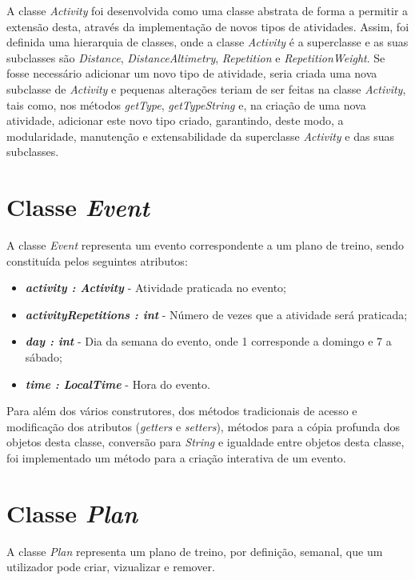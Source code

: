 \documentclass[a4paper,12pt]{scrreprt}
\begin{document}
    A classe \textit{Activity} foi desenvolvida como uma classe abstrata de forma a permitir a extensão desta, através da implementação de novos tipos de atividades. Assim, foi definida uma hierarquia de classes, onde a classe \textit{Activity} é a superclasse e as suas subclasses são \textit{Distance}, \textit{DistanceAltimetry}, \textit{Repetition} e \textit{RepetitionWeight}.
    Se fosse necessário adicionar um novo tipo de atividade, seria criada uma nova subclasse de \textit{Activity} e pequenas alterações teriam de ser feitas na classe \textit{Activity}, tais como, nos métodos \textit{getType}, \textit{getTypeString} e, na criação de uma nova atividade, adicionar este novo tipo criado, garantindo, deste modo, a modularidade, manutenção e extensabilidade da superclasse \textit{Activity} e das suas subclasses.

\section{Classe \textit{Event}}
    A classe \textit{Event} representa um evento correspondente a um plano de treino, sendo constituída pelos seguintes atributos:

    \begin{itemize}
        \item \textit{\textbf{activity : Activity}} - Atividade praticada no evento;
        \item \textit{\textbf{activityRepetitions : int}} - Número de vezes que a atividade será praticada;
        \item \textit{\textbf{day : int}} - Dia da semana do evento, onde 1 corresponde a domingo e 7 a sábado;
        \item \textit{\textbf{time : LocalTime}} - Hora do evento.
    \end{itemize}

    Para além dos vários construtores, dos métodos tradicionais de acesso e modificação dos atributos (\textit{getters} e \textit{setters}), métodos para a cópia profunda dos objetos desta classe, conversão para \textit{String} e
    igualdade entre objetos desta classe, foi implementado um método para a criação interativa de um evento.

\section{Classe \textit{Plan}}
    A classe \textit{Plan} representa um plano de treino, por definição, semanal, que um utilizador pode criar, vizualizar e remover.
\end{document}
